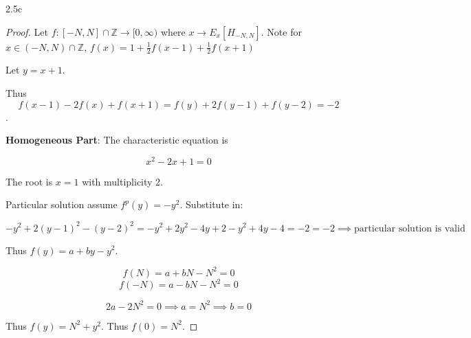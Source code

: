 \documentclass{article}
\newcommand{\Z}{\mathbb{Z}}
\begin{document}
\begin{PROB}{2.5c}\label{Problem 2.5c.}
\end{PROB}
\begin{proof}
    Let $f: [-N, N] \cap \Z \to [0, \infty)$ where $x \to E_{x}[H_{-N, N}]$. Note for $x \in (-N, N) \cap \Z$, $f(x) = 1 + \frac{1}{2}f(x - 1) + \frac{1}{2}f(x + 1)$

    Let $y = x + 1$.  
    
    Thus \[f(x - 1) - 2f(x) + f(x + 1) = f(y) + 2f(y - 1) + f(y - 2)  = -2\]. 

    \textbf{Homogeneous Part}: The characteristic equation is

    \[x^2 - 2x + 1 = 0\]

    The root is $x = 1$ with multiplicity 2. 
    
    Particular solution assume $f^p(y) = -y^2$. Substitute in:
    
    \[-y^2 + 2(y - 1)^2 -(y - 2)^2 = -y^2 + 2y^2 - 4y + 2 - y^2 + 4y - 4 = -2 = -2 \implies \text{particular solution is valid}\]

    Thus $f(y) = a + by - y^2$.
    
    \[f(N) = a + bN - N^2 = 0 \]
    \[f(-N) = a - bN - N^2 = 0\] 

    \[2a - 2N^2 = 0 \implies a = N^2 \implies b = 0\]
    
    Thus $f(y) = N^2 + y^2$. Thus $f(0) = N^2$.   
\end{proof}
\end{document}
